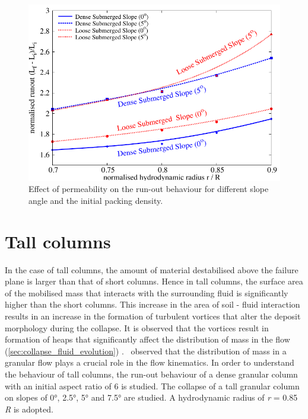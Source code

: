 \begin{figure}
\centering
\includegraphics[width=0.97\columnwidth]{Perm_Runout_slope}
\caption{Effect of permeability on the run-out behaviour for different slope 
angle and the initial packing density.}
\label{fig:Perm_Runout_slope}
\end{figure}


\section{Tall columns}

In the case of tall columns, the amount of material destabilised above the 
failure plane is larger than that of short columns. Hence in tall columns, 
the surface area of the mobilised mass that interacts with the 
surrounding fluid is significantly higher than the short columns. This 
increase in the area of soil - fluid interaction results in an increase
in the formation of turbulent vortices that alter the deposit morphology during 
the collapse. It is observed that the vortices result in formation of heaps 
that significantly affect the distribution of mass in the flow 
(\cref{sec:collapse_fluid_evolution}) .~\citet{Staron2007a} observed that the 
distribution of mass in a granular flow plays a crucial role in the flow 
kinematics. In order to understand the behaviour of tall columns, the run-out 
behaviour of a dense granular column with an initial aspect ratio of 6 is 
studied. The collapse of a tall granular column on slopes of 0\si{\degree}, 
2.5\si{\degree}, 5\si{\degree} and 7.5\si{\degree} are studied. A hydrodynamic 
radius of \textit{r} = 0.85 \textit{R} is adopted. 

